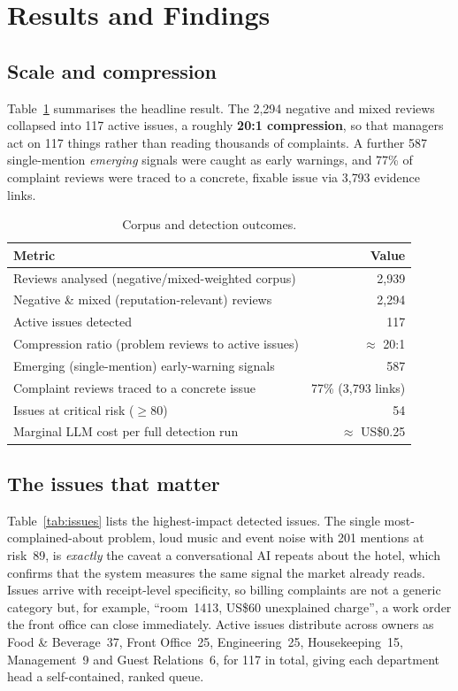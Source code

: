 \documentclass[11pt,a4paper]{article}
\begin{document}
\section{Results and Findings}
\label{sec:results}

\subsection{Scale and compression}
Table~\ref{tab:scale} summarises the headline result. The 2{,}294 negative and mixed reviews collapsed
into 117 active issues, a roughly \textbf{20:1 compression}, so that managers act on 117 things rather
than reading thousands of complaints. A further 587 single-mention \emph{emerging} signals were caught
as early warnings, and 77\% of complaint reviews were traced to a concrete, fixable issue via 3{,}793
evidence links.

\begin{table}[H]
\centering
\caption{Corpus and detection outcomes.}
\label{tab:scale}
\begin{tabularx}{\linewidth}{Xr}
\toprule
\textbf{Metric} & \textbf{Value} \\
\midrule
Reviews analysed (negative/mixed-weighted corpus) & 2{,}939 \\
Negative \& mixed (reputation-relevant) reviews & 2{,}294 \\
Active issues detected & 117 \\
Compression ratio (problem reviews to active issues) & $\approx$ 20:1 \\
Emerging (single-mention) early-warning signals & 587 \\
Complaint reviews traced to a concrete issue & 77\% (3{,}793 links) \\
Issues at critical risk ($\geq 80$) & 54 \\
Marginal LLM cost per full detection run & $\approx$ US\$0.25 \\
\bottomrule
\end{tabularx}
\end{table}

\subsection{The issues that matter}
Table~\ref{tab:issues} lists the highest-impact detected issues. The single most-complained-about
problem, loud music and event noise with 201 mentions at risk~89, is \emph{exactly} the caveat a
conversational AI repeats about the hotel, which confirms that the system measures the same signal the
market already reads. Issues arrive with receipt-level specificity, so billing complaints are not a
generic category but, for example, ``room~1413, US\$60 unexplained charge'', a work order the front
office can close immediately. Active issues distribute across owners as Food \& Beverage~37, Front
Office~25, Engineering~25, Housekeeping~15, Management~9 and Guest Relations~6, for 117 in total, giving
each department head a self-contained, ranked queue.
\end{document}
